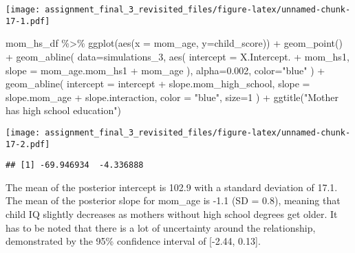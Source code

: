 \documentclass[
]{article}
\newenvironment{Shaded}{\begin{snugshade}}{\end{snugshade}}
\newcommand{\AttributeTok}[1]{\textcolor[rgb]{0.77,0.63,0.00}{#1}}
\newcommand{\DecValTok}[1]{\textcolor[rgb]{0.00,0.00,0.81}{#1}}
\newcommand{\FloatTok}[1]{\textcolor[rgb]{0.00,0.00,0.81}{#1}}
\newcommand{\FunctionTok}[1]{\textcolor[rgb]{0.00,0.00,0.00}{#1}}
\newcommand{\NormalTok}[1]{#1}
\newcommand{\SpecialCharTok}[1]{\textcolor[rgb]{0.00,0.00,0.00}{#1}}
\newcommand{\StringTok}[1]{\textcolor[rgb]{0.31,0.60,0.02}{#1}}
\begin{document}
\texttt{[image: assignment\_final\_3\_revisited\_files/figure-latex/unnamed-chunk-17-1.pdf]}

\begin{Shaded}
\begin{Highlighting}[]
\NormalTok{mom\_hs\_df }\SpecialCharTok{\%\textgreater{}\%} \FunctionTok{ggplot}\NormalTok{(}\FunctionTok{aes}\NormalTok{(}\AttributeTok{x =}\NormalTok{ mom\_age, }\AttributeTok{y=}\NormalTok{child\_score)) }\SpecialCharTok{+}
  \FunctionTok{geom\_point}\NormalTok{() }\SpecialCharTok{+}
  \FunctionTok{geom\_abline}\NormalTok{(}
    \AttributeTok{data=}\NormalTok{simulations\_3,}
    \FunctionTok{aes}\NormalTok{(}
      \AttributeTok{intercept =}\NormalTok{ X.Intercept. }\SpecialCharTok{+}\NormalTok{ mom\_hs1,}
      \AttributeTok{slope =}\NormalTok{ mom\_age.mom\_hs1 }\SpecialCharTok{+}\NormalTok{ mom\_age}
\NormalTok{    ),}
    \AttributeTok{alpha=}\FloatTok{0.002}\NormalTok{,}
    \AttributeTok{color=}\StringTok{"blue"}
\NormalTok{  ) }\SpecialCharTok{+}
  \FunctionTok{geom\_abline}\NormalTok{(}
    \AttributeTok{intercept =}\NormalTok{ intercept }\SpecialCharTok{+}\NormalTok{ slope.mom\_high\_school,}
    \AttributeTok{slope =}\NormalTok{ slope.mom\_age }\SpecialCharTok{+}\NormalTok{ slope.interaction,}
    \AttributeTok{color =} \StringTok{"blue"}\NormalTok{,}
    \AttributeTok{size=}\DecValTok{1}
\NormalTok{  ) }\SpecialCharTok{+}
  \FunctionTok{ggtitle}\NormalTok{(}\StringTok{"Mother has high school education"}\NormalTok{)}
\end{Highlighting}
\end{Shaded}

\texttt{[image: assignment\_final\_3\_revisited\_files/figure-latex/unnamed-chunk-17-2.pdf]}

\begin{Shaded}
\end{Shaded}

\begin{verbatim}
## [1] -69.946934  -4.336888
\end{verbatim}

The mean of the posterior intercept is 102.9 with a standard deviation
of 17.1. The mean of the posterior slope for mom\_age is -1.1 (SD =
0.8), meaning that child IQ slightly decreases as mothers without high
school degrees get older. It has to be noted that there is a lot of
uncertainty around the relationship, demonstrated by the 95\% confidence
interval of {[}-2.44, 0.13{]}.
\end{document}

